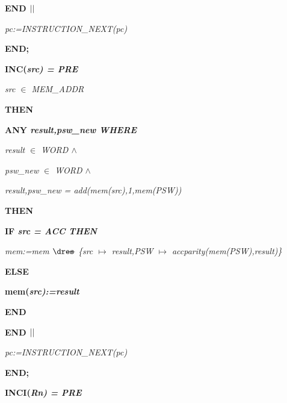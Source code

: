 \begin{sloppypar}
\hspace*{0.20in}\bf END  $\mbox{$\mid\mid$}$ 

\hspace*{0.20in}\it pc\rm :=\it INSTRUCTION\_NEXT\rm (\it pc\rm )

\hspace*{0.10in}\bf END\rm ;

\hspace*{0.10in}\bf INC\rm (\it src\rm ) \rm = \bf PRE

\hspace*{0.20in}\it src $\in$  \it MEM\_ADDR

\hspace*{0.10in}\bf THEN

\hspace*{0.20in}\bf ANY \it result\rm ,\it psw\_new \bf WHERE

\hspace*{0.30in}\it result $\in$  \it WORD  $\land$ 

\hspace*{0.30in}\it psw\_new $\in$  \it WORD  $\land$ 

\hspace*{0.30in}\it result\rm ,\it psw\_new \rm = \it add\rm (\it mem\rm (\it src\rm )\rm ,\rm 1\rm ,\it mem\rm (\it PSW\rm )\rm )

\hspace*{0.20in}\bf THEN

\hspace*{0.30in}\bf IF \it src \rm = \it ACC \bf THEN

\hspace*{0.40in}\it mem\rm :=\it mem $\lover$ \rm \{\it src $\mapsto$ \it result\rm ,\it PSW $\mapsto$ \it accparity\rm (\it mem\rm (\it PSW\rm )\rm ,\it result\rm )\rm \}

\hspace*{0.30in}\bf ELSE

\hspace*{0.40in}\bf mem\rm (\it src\rm )\rm :=\it result

\hspace*{0.30in}\bf END

\hspace*{0.20in}\bf END  $\mbox{$\mid\mid$}$ 

\hspace*{0.20in}\it pc\rm :=\it INSTRUCTION\_NEXT\rm (\it pc\rm )

\hspace*{0.10in}\bf END\rm ;

\hspace*{0.10in}\bf INCI\rm (\it Rn\rm ) \rm = \bf PRE


\end{sloppypar}
